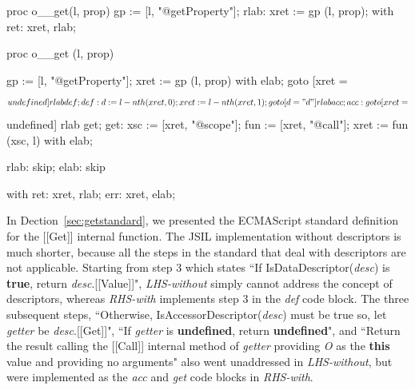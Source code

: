 \documentclass[a4paper,11pt,twoside]{report}
\begin{document}
\begin{minipage}{.45\textwidth}
\begin{lstjsil}
proc o__get(l, prop) {
          gp := [l, "@getProperty"];
    rlab: xret := gp (l, prop);
}
with
{
    ret: xret, rlab;
}
\end{lstjsil}
\end{minipage}%
\hfill
\begin{minipage}{.50\textwidth}
\begin{lstjsil}
proc o__get (l, prop) {
				gp := [l, "@getProperty"];
				xret := gp (l, prop) with elab;	
				goto [xret = $$undefined] rlab def;
			
	def:	d := l-nth (xret, 0);
				xret := l-nth (xret, 1);
				goto [d = "d"] rlab acc;
			
	acc:	goto [xret = $$undefined] rlab get;
	get:	xsc := [xret, "@scope"];
				fun := [xret, "@call"];
				xret := fun (xsc, l) with elab;
			
	rlab:	skip;
	elab:	skip
}
with
{
    ret: xret, rlab;
    err: xret, elab;
}
\end{lstjsil}
\end{minipage}

In Dection~\ref{sec:getstandard}, we presented the ECMAScript standard definition for the [[Get]] internal function. The JSIL implementation without descriptors is much shorter, because all the steps in the standard that deal with descriptors are not applicable. Starting from step 3 which states ``If IsDataDescriptor(\textit{desc}) is \textbf{true}, return \textit{desc}.[[Value]]", \textit{LHS-without} simply cannot address the concept of descriptors, whereas \textit{RHS-with} implements step 3 in the \textit{def} code block. The three subsequent steps, ``Otherwise, IsAccessorDescriptor(\textit{desc}) must be true so, let \textit{getter} be \textit{desc}.[[Get]]", ``If \textit{getter} is \textbf{undefined}, return \textbf{undefined}", and ``Return the result calling the [[Call]] internal method of \textit{getter} providing \textit{O} as the \textbf{this} value and providing no arguments"\cite{EcmaScript} also went unaddressed in \textit{LHS-without}, but were implemented as the \textit{acc} and \textit{get} code blocks in \textit{RHS-with}.
\end{document}

